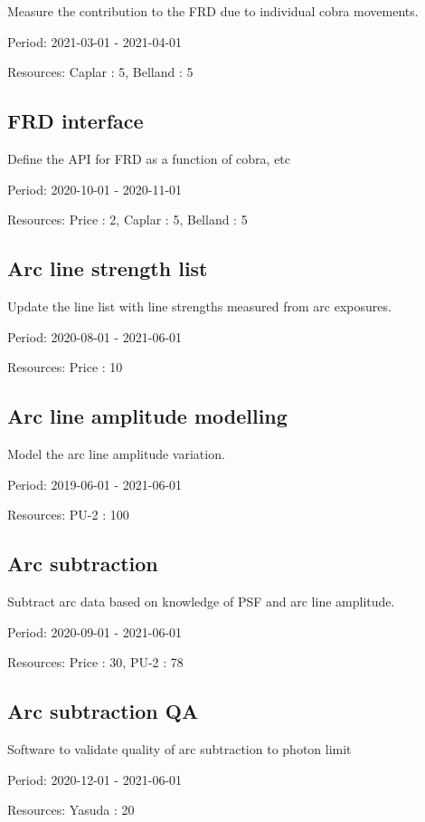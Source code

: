 Measure the contribution to the FRD due to individual cobra movements.

Period: 2021-03-01 - 2021-04-01

Resources: Caplar : 5, Belland : 5

\subsection{FRD interface}

Define the API for FRD as a function of cobra, etc

Period: 2020-10-01 - 2020-11-01

Resources: Price : 2, Caplar : 5, Belland : 5

\subsection{Arc line strength list}

Update the line list with line strengths measured from arc exposures.

Period: 2020-08-01 - 2021-06-01

Resources: Price : 10

\subsection{Arc line amplitude modelling}

Model the arc line amplitude variation.

Period: 2019-06-01 - 2021-06-01

Resources: PU-2 : 100

\subsection{Arc subtraction}

Subtract arc data based on knowledge of PSF and arc line amplitude.

Period: 2020-09-01 - 2021-06-01

Resources: Price : 30, PU-2 : 78

\subsection{Arc subtraction QA}

Software to validate quality of arc subtraction to photon limit

Period: 2020-12-01 - 2021-06-01

Resources: Yasuda : 20

